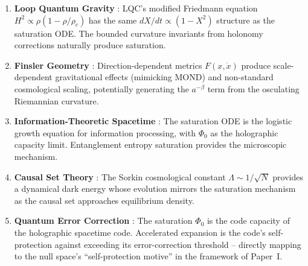\documentclass[aps,prd,twocolumn,superscriptaddress,nofootinbib]{revtex4-2}
\begin{document}
\begin{enumerate}
\item \textbf{Loop Quantum Gravity} \cite{Rovelli2004,Thiemann2007}: LQC's modified Friedmann equation $H^2 \propto \rho(1 - \rho/\rho_c)$ has the same $dX/dt \propto (1-X^2)$ structure as the saturation ODE. The bounded curvature invariants from holonomy corrections naturally produce saturation.

\item \textbf{Finsler Geometry} \cite{Bao2000,Girelli2007}: Direction-dependent metrics $F(x, \dot{x})$ produce scale-dependent gravitational effects (mimicking MOND) and non-standard cosmological scaling, potentially generating the $a^{-\beta}$ term from the osculating Riemannian curvature.

\item \textbf{Information-Theoretic Spacetime} \cite{Wheeler1990,Bousso2002}: The saturation ODE is the logistic growth equation for information processing, with $\Phi_0$ as the holographic capacity limit. Entanglement entropy saturation \cite{VanRaamsdonk2010} provides the microscopic mechanism.

\item \textbf{Causal Set Theory} \cite{Bombelli1987}: The Sorkin cosmological constant $\Lambda \sim 1/\sqrt{N}$ provides a dynamical dark energy whose evolution mirrors the saturation mechanism as the causal set approaches equilibrium density.

\item \textbf{Quantum Error Correction} \cite{Almheiri2015}: The saturation $\Phi_0$ is the code capacity of the holographic spacetime code. Accelerated expansion is the code's self-protection against exceeding its error-correction threshold -- directly mapping to the null space's ``self-protection motive'' in the framework of Paper~I.


\end{enumerate}
\end{document}
